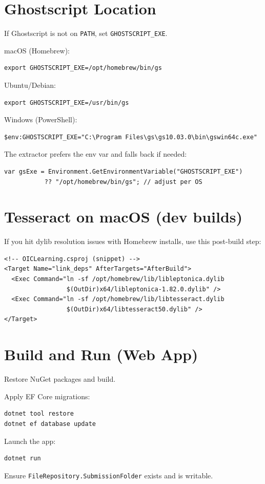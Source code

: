 \documentclass[ms,twoside,print]{nuthesis}
\begin{document}
\section{Ghostscript Location}
If Ghostscript is not on \texttt{PATH}, set \texttt{GHOSTSCRIPT\_EXE}.

\noindent macOS (Homebrew):
\begin{lstlisting}
export GHOSTSCRIPT_EXE=/opt/homebrew/bin/gs
\end{lstlisting}

\noindent Ubuntu/Debian:
\begin{lstlisting}
export GHOSTSCRIPT_EXE=/usr/bin/gs
\end{lstlisting}

\noindent Windows (PowerShell):
\begin{lstlisting}
$env:GHOSTSCRIPT_EXE="C:\Program Files\gs\gs10.03.0\bin\gswin64c.exe"
\end{lstlisting}

\noindent The extractor prefers the env var and falls back if needed:
\begin{lstlisting}[language={[Sharp]C}]
var gsExe = Environment.GetEnvironmentVariable("GHOSTSCRIPT_EXE")
           ?? "/opt/homebrew/bin/gs"; // adjust per OS
\end{lstlisting}

\section{Tesseract on macOS (dev builds)}
If you hit dylib resolution issues with Homebrew installs, use this post-build step:

\begin{lstlisting}
<!-- OICLearning.csproj (snippet) -->
<Target Name="link_deps" AfterTargets="AfterBuild">
  <Exec Command="ln -sf /opt/homebrew/lib/libleptonica.dylib
                 $(OutDir)x64/libleptonica-1.82.0.dylib" />
  <Exec Command="ln -sf /opt/homebrew/lib/libtesseract.dylib
                 $(OutDir)x64/libtesseract50.dylib" />
</Target>
\end{lstlisting}

\section{Build and Run (Web App)}
\begin{compactenum}
  \item Restore NuGet packages and build.
  \item Apply EF Core migrations:
\begin{lstlisting}
dotnet tool restore
dotnet ef database update
\end{lstlisting}
  \item Launch the app:
\begin{lstlisting}
dotnet run
\end{lstlisting}
  \item Ensure \texttt{FileRepository.SubmissionFolder} exists and is writable.
\end{compactenum}
\end{document}
